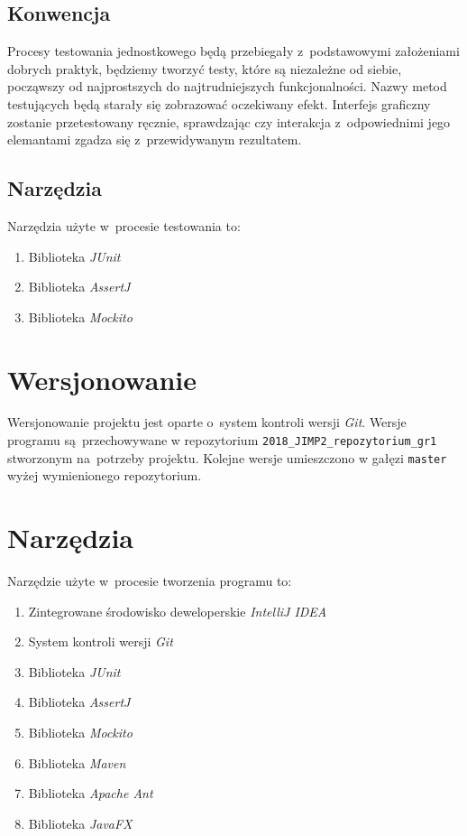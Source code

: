 \documentclass[a4paper,11pt]{article}
\begin{document}
		\subsection{Konwencja}
		Procesy testowania jednostkowego będą przebiegały z~podstawowymi założeniami dobrych praktyk, będziemy tworzyć testy, które są niezależne od siebie, począwszy od najprostszych do najtrudniejszych funkcjonalności. Nazwy metod testujących będą starały się zobrazować oczekiwany efekt. Interfejs graficzny zostanie przetestowany ręcznie, sprawdzając czy interakcja z~odpowiednimi jego elemantami zgadza się z~przewidywanym rezultatem.
		\subsection{Narzędzia}
		Narzędzia użyte w~procesie testowania to:
		\begin{enumerate}
			\item Biblioteka \textsl{JUnit}
			\item Biblioteka \textsl{AssertJ}
			\item Biblioteka \textsl{Mockito}
		\end{enumerate}
	\section{Wersjonowanie}
		Wersjonowanie projektu jest oparte o~system kontroli wersji \textsl{Git}. Wersje programu są~przechowywane w repozytorium \texttt{2018\_JIMP2\_repozytorium\_gr1} stworzonym na~potrzeby projektu. Kolejne wersje umieszczono w gałęzi \texttt{master} wyżej wymienionego repozytorium.
	\section{Narzędzia}	
	Narzędzie użyte w~procesie tworzenia programu to:
	\begin{enumerate}
		\item Zintegrowane środowisko deweloperskie \textsl{IntelliJ IDEA}
		\item System kontroli wersji \textsl{Git}
		\item Biblioteka \textsl{JUnit}
		\item Biblioteka \textsl{AssertJ}
		\item Biblioteka \textsl{Mockito}
		\item Biblioteka \textsl{Maven}
		\item Biblioteka \textsl{Apache Ant}
		\item Biblioteka \textsl{JavaFX}
	\end{enumerate}
	
\end{document}
